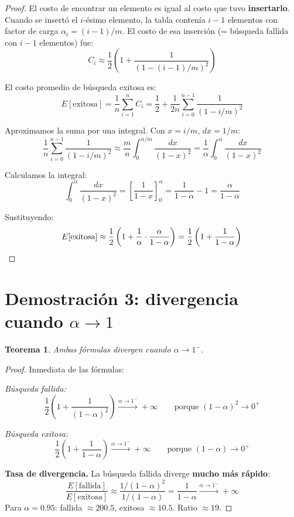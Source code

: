 \documentclass[11pt, letterpaper]{article}
\theoremstyle{definition}
\theoremstyle{plain}
\newtheorem{theorem}{Teorema}[section]
\theoremstyle{remark}
\begin{document}
\begin{proof}
El costo de encontrar un elemento es igual al costo que tuvo
\textbf{insertarlo}. Cuando se insertó el $i$-ésimo elemento, la
tabla contenía $i - 1$ elementos con factor de carga
$\alpha_i = (i{-}1)/m$. El costo de esa inserción (= búsqueda
fallida con $i{-}1$ elementos) fue:
\[
  C_i \approx \frac{1}{2}\left(1 + \frac{1}{(1 - (i{-}1)/m)^2}\right)
\]

El costo promedio de búsqueda exitosa es:
\[
  E[\text{exitosa}]
  = \frac{1}{n} \sum_{i=1}^{n} C_i
  = \frac{1}{2} + \frac{1}{2n}
    \sum_{i=0}^{n-1} \frac{1}{(1 - i/m)^2}
\]

Aproximamos la suma por una integral. Con $x = i/m$, $dx = 1/m$:
\[
  \frac{1}{n} \sum_{i=0}^{n-1} \frac{1}{(1 - i/m)^2}
  \approx \frac{m}{n} \int_0^{n/m} \frac{dx}{(1-x)^2}
  = \frac{1}{\alpha} \int_0^{\alpha} \frac{dx}{(1-x)^2}
\]

Calculamos la integral:
\[
  \int_0^{\alpha} \frac{dx}{(1-x)^2}
  = \left[\frac{1}{1-x}\right]_0^{\alpha}
  = \frac{1}{1-\alpha} - 1
  = \frac{\alpha}{1-\alpha}
\]

Sustituyendo:
\[
  E[\text{exitosa}]
  \approx \frac{1}{2}\left(1 + \frac{1}{\alpha}
    \cdot \frac{\alpha}{1-\alpha}\right)
  = \frac{1}{2}\left(1 + \frac{1}{1-\alpha}\right) \qedhere
\]
\end{proof}

\section{Demostración 3: divergencia cuando
  \texorpdfstring{$\alpha \to 1$}{alpha -> 1}}

\begin{theorem}\label{thm:divergence}
Ambas fórmulas divergen cuando $\alpha \to 1^-$.
\end{theorem}

\begin{proof}
Inmediata de las fórmulas:

\emph{Búsqueda fallida:}
\[
  \frac{1}{2}\left(1 + \frac{1}{(1-\alpha)^2}\right)
  \xrightarrow{\alpha \to 1^-} +\infty
  \qquad \text{porque } (1{-}\alpha)^2 \to 0^+
\]

\emph{Búsqueda exitosa:}
\[
  \frac{1}{2}\left(1 + \frac{1}{1-\alpha}\right)
  \xrightarrow{\alpha \to 1^-} +\infty
  \qquad \text{porque } (1{-}\alpha) \to 0^+
\]

\textbf{Tasa de divergencia.} La búsqueda fallida diverge
\textbf{mucho más rápido}:
\[
  \frac{E[\text{fallida}]}{E[\text{exitosa}]}
  \approx \frac{1/(1{-}\alpha)^2}{1/(1{-}\alpha)}
  = \frac{1}{1-\alpha}
  \xrightarrow{\alpha \to 1^-} +\infty
\]
Para $\alpha = 0.95$: fallida $\approx 200.5$, exitosa $\approx 10.5$.
Ratio $\approx 19$.
\end{proof}
\end{document}
